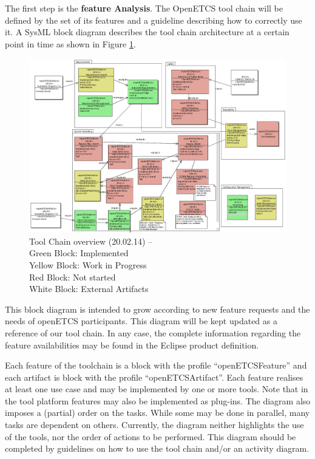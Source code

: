 The first step is the {\bf feature Analysis}.
The OpenETCS tool chain  will be defined by the set of its features and
a guideline describing how to correctly use it.
A SysML block diagram describes the tool chain architecture at a certain point in time as shown in
Figure \ref{fig:overview}. 
\begin{figure}[htbp]
\includegraphics[width=\textwidth]{ToolChainmodel}
\caption{\label{fig:overview} Tool Chain overview (20.02.14) -- \\
  Green Block: Implemented \\
  Yellow Block: Work in Progress \\
  Red Block: Not started \\
  White Block: External Artifacts} 
\end{figure}
This block diagram is intended to grow according to new feature requests and the
needs of openETCS participants.  This diagram will be kept updated
as a reference of our tool chain. In any case, the complete information
regarding the feature availabilities  may be found in the Eclipse product
definition.

Each feature of the toolchain is a block with the profile ``openETCSFeature''
and  each artifact is block with the profile ``openETCSArtifact''.  Each
feature realises at least one use case and may be implemented by one or more tools.
Note that in the tool platform features  may also be
implemented as plug-ins. The diagram also imposes a (partial) order
on the tasks. While some may be done in parallel, many tasks are dependent on others.
Currently, the diagram neither highlights the use of the tools, nor the order of actions
to be performed. This diagram should be completed by guidelines on
how to use the tool chain and/or an activity diagram.

